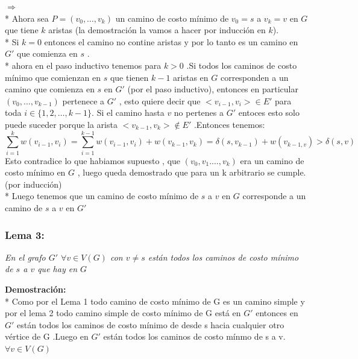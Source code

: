 \documentclass{article}
\begin{document}
    \noindent $\Longrightarrow $
    \\*
    Ahora sea $P = \left(v_0,\dots,v_k \right)$ un camino de costo m\'inimo de $v_0 = s $ a  $v_k = v$ en $G$ que tiene $k$ aristas (la demostraci\'on la vamos a hacer por inducci\'on en $k$).
    \\*
    Si $k=0$ entonces el camino no contine aristas y por lo tanto es un camino en $G'$ que comienza en $s$ .
    \\*
    ahora en el paso inductivo tenemos para $k>0$ .Si todos los caminos de costo m\'inimo que comienzan en $s$  que tienen $k-1$ aristas en $G$ corresponden a un camino que comienza en $s$ en $G'$ (por el paso inductivo), entonces en particular  $\left(v_0,\dots,v_{k-1}\right)$
    pertenece a $G'$ , esto quiere decir que $<v_{i-1},v_i> \in E'$ para toda $i \in \{1,2,\dots, k-1\}$. Si el camino hasta $v$ no pertenes a $G'$ entoces esto solo puede suceder porque la arista  $<v_{k-1}, v_{k}> \notin E'$ .Entonces tenemos:
    \begin{equation*}
        \sum_{i=1}^{k} w\left(v_{i-1},v_{i}\right) = \sum_{i=1}^{k-1} w\left(v_{i-1},v_{i}\right) + w\left(v_{k-1} , v_{k}\right) = \delta\left(s,v_{k-1}\right) + w\left(v_{k-1, v}\right) > \delta\left(s, v\right)
    \end{equation*}
    \noindent Esto contradice lo que habiamos supuesto , que $\left(v_0,v_1.\dots, v_k\right)$ era un camino de costo m\'inimo en $G$ , luego queda demostrado que para un k arbitrario se cumple. (por inducci\'on)
    \\*
    Luego tenemos que un camino de costo m\'inimo de $s$ a $v$ en $G$ corresponde a un camino de $s$ a $v$ en $G'$ 
    
    \vspace*{0.5cm} 

    \subsubsection{Lema 3:}
    
    \textit{En el grafo $G'$ $\forall v \in V(G) $ con $v\neq s$  est\'an todos los caminos de costo m\'inimo de $s$ a $v$ que hay en $G$}
    
    \vspace*{0.3cm} 
     
    \noindent \textbf{Demostraci\'on:}
    \\*
    Como por el Lema 1 todo  camino de costo m\'inimo de G es un camino simple y por el lema 2 todo camino simple de
    costo m\'inimo  de G est\'a en $G'$ entonces en $G'$ est\'an  todos los caminos de costo m\'inimo de desde s hacia 
    cualquier otro v\'ertice de G .Luego en $G'$  est\'an todos los caminos de costo m\'inmo de s a v. 
    $\forall v\in V(G)$
\end{document}
